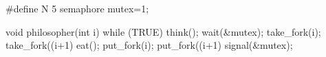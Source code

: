 \documentclass[varwidth=16em,crop]{standalone}
\begin{document}
\begin{ccode}
#define N 5
semaphore mutex=1;
  
void philosopher(int i)
{
    while (TRUE) {
      think();
      wait(&mutex);
         take_fork(i);
         take_fork((i+1) %
         eat();
         put_fork(i);
         put_fork((i+1) %
      signal(&mutex);
    }
}        
\end{ccode}
\end{document}
